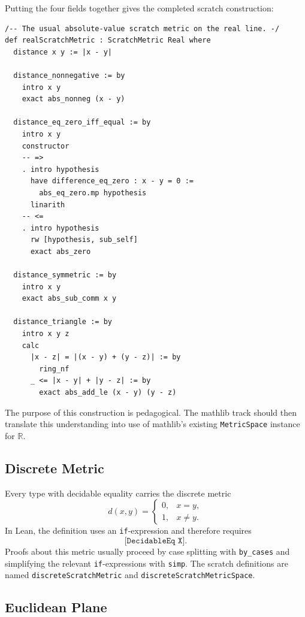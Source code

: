 \begin{example*}
Putting the four fields together gives the completed scratch construction:
\begin{verbatim}
/-- The usual absolute-value scratch metric on the real line. -/
def realScratchMetric : ScratchMetric Real where
  distance x y := |x - y|

  distance_nonnegative := by
    intro x y
    exact abs_nonneg (x - y)

  distance_eq_zero_iff_equal := by
    intro x y
    constructor
    -- =>
    . intro hypothesis
      have difference_eq_zero : x - y = 0 :=
        abs_eq_zero.mp hypothesis
      linarith
    -- <=
    . intro hypothesis
      rw [hypothesis, sub_self]
      exact abs_zero

  distance_symmetric := by
    intro x y
    exact abs_sub_comm x y

  distance_triangle := by
    intro x y z
    calc
      |x - z| = |(x - y) + (y - z)| := by
        ring_nf
      _ <= |x - y| + |y - z| := by
        exact abs_add_le (x - y) (y - z)
\end{verbatim}
The purpose of this construction is pedagogical. The mathlib track should then
translate this understanding into use of mathlib's existing
\texttt{MetricSpace} instance for \(\mathbb{R}\).
\end{example*}

\subsection{Discrete Metric}

\begin{example*}
Every type with decidable equality carries the discrete metric
\[
  d(x,y)=
  \begin{cases}
    0, & x=y,\\
    1, & x\ne y.
  \end{cases}
\]
In Lean, the definition uses an \texttt{if}-expression and therefore requires
\[
  \texttt{[DecidableEq X]}.
\]
Proofs about this metric usually proceed by case splitting with
\texttt{by\_cases} and simplifying the relevant \texttt{if}-expressions with
\texttt{simp}. The scratch definitions are named
\texttt{discreteScratchMetric} and \texttt{discreteScratchMetricSpace}.
\end{example*}

\subsection{Euclidean Plane}

